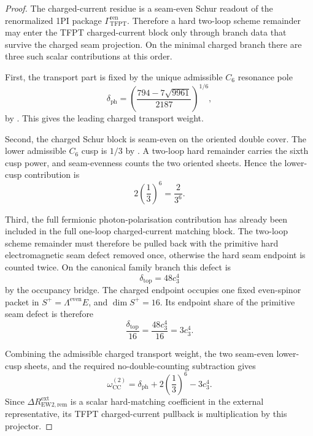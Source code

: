 \documentclass[11pt,a4paper]{article}
\theoremstyle{definition}
\theoremstyle{remark}
\newcommand{\cthree}{c_3}
\newcommand{\deltatop}{\delta_{\mathrm{top}}}
\newcommand{\omegaCCEW}{\omega_{\mathrm{CC}}^{(2)}}
\begin{document}
\begin{proof}
The charged-current residue is a seam-even Schur readout of the renormalized 1PI package
$\Gamma_{\mathrm{TFPT}}^{\mathrm{ren}}$. Therefore a hard two-loop scheme remainder may enter the
TFPT charged-current block only through branch data that survive the charged seam projection. On the
minimal charged branch there are three such scalar contributions at this order.

First, the transport part is fixed by the unique admissible $C_6$ resonance pole
\[
\delta_{\mathrm{ph}}
=
\left(
\frac{794-7\sqrt{9961}}{2187}
\right)^{1/6},
\]
by . This gives the leading charged transport weight.

Second, the charged Schur block is seam-even on the oriented double cover. The lower admissible
$C_6$ cusp is $1/3$ by . A two-loop
hard remainder carries the sixth cusp power, and seam-evenness counts the two oriented sheets.
Hence the lower-cusp contribution is
\[
2\left(\frac13\right)^6=\frac{2}{3^6}.
\]

Third, the full fermionic photon-polarisation contribution has already been included in the full
one-loop charged-current matching block. The two-loop scheme remainder must therefore be pulled
back with the primitive hard electromagnetic seam defect removed once, otherwise the hard seam
endpoint is counted twice. On the canonical family branch this defect is
\[
\deltatop=48\cthree^4
\]
by the occupancy bridge. The charged endpoint occupies one fixed even-spinor packet in
$S^+=\Lambda^{\mathrm{even}}E$, and $\dim S^+=16$. Its endpoint share of the primitive seam defect is
therefore
\[
\frac{\deltatop}{16}=\frac{48\cthree^4}{16}=3\cthree^4.
\]

Combining the admissible charged transport weight, the two seam-even lower-cusp sheets, and the
required no-double-counting subtraction gives
\[
\omegaCCEW
=
\delta_{\mathrm{ph}}
+
2\left(\frac13\right)^6
-
3\cthree^4.
\]
Since $\Delta R_{\mathrm{EW2},\mathrm{rem}}^{\mathrm{ext}}$ is a scalar hard-matching coefficient in
the external representative, its TFPT charged-current pullback is multiplication by this projector.
\end{proof}
\end{document}
